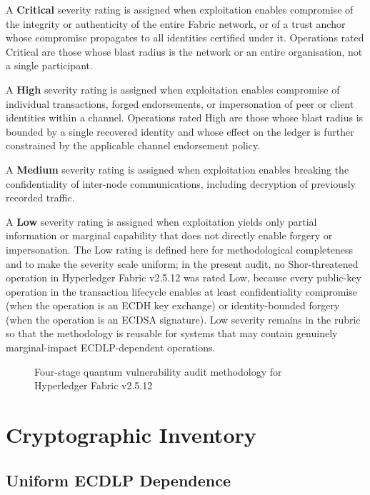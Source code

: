 \documentclass[conference]{IEEEtran}
\begin{document}
A \textbf{Critical} severity rating is assigned when exploitation enables
compromise of the integrity or authenticity of the entire Fabric network,
or of a trust anchor whose compromise propagates to all identities
certified under it. Operations rated Critical are those whose blast
radius is the network or an entire organisation, not a single
participant.

A \textbf{High} severity rating is assigned when exploitation enables
compromise of individual transactions, forged endorsements, or
impersonation of peer or client identities within a channel. Operations
rated High are those whose blast radius is bounded by a single recovered
identity and whose effect on the ledger is further constrained by the
applicable channel endorsement policy.

A \textbf{Medium} severity rating is assigned when exploitation enables
breaking the confidentiality of inter-node communications, including
decryption of previously recorded traffic.

A \textbf{Low} severity rating is assigned when exploitation yields only
partial information or marginal capability that does not directly enable
forgery or impersonation. The Low rating is defined here for
methodological completeness and to make the severity scale uniform; in
the present audit, no Shor-threatened operation in Hyperledger Fabric
v2.5.12 was rated Low, because every public-key operation in the
transaction lifecycle enables at least confidentiality compromise (when
the operation is an ECDH key exchange) or identity-bounded forgery
(when the operation is an ECDSA signature). Low severity remains in
the rubric so that the methodology is reusable for systems that may
contain genuinely marginal-impact ECDLP-dependent operations.



\begin{figure}
    \centering
    
    \caption{Four-stage quantum vulnerability audit methodology for
Hyperledger Fabric v2.5.12}
    \label{fig:ch4_methodology}
\end{figure}

\section{Cryptographic Inventory}
\label{sec:tm_inventory}

\subsection{Uniform ECDLP Dependence}
\end{document}
